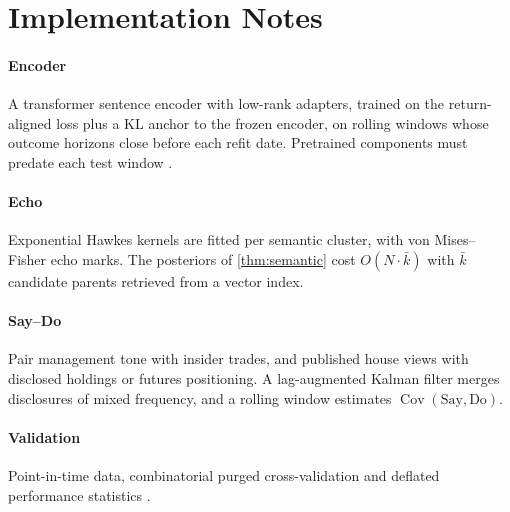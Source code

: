 \documentclass[10pt,twocolumn,letterpaper]{article}
\theoremstyle{plain}
\theoremstyle{definition}
\theoremstyle{remark}
\DeclareMathOperator{\Cov}{Cov}
\begin{document}
\section{Implementation Notes}\label{app:impl}

\paragraph{Encoder} A transformer sentence encoder \citep{reimers2019} with low-rank adapters, trained on the return-aligned loss plus a KL anchor to the frozen encoder, on rolling windows whose outcome horizons close before each refit date. Pretrained components must predate each test window \citep{glasserman2023}.

\paragraph{Echo} Exponential Hawkes kernels are fitted per semantic cluster, with von Mises--Fisher echo marks. The posteriors of \cref{thm:semantic} cost $O(N\cdot\bar k)$ with $\bar k$ candidate parents retrieved from a vector index.

\paragraph{Say--Do} Pair management tone with insider trades, and published house views with disclosed holdings or futures positioning. A lag-augmented Kalman filter merges disclosures of mixed frequency, and a rolling window estimates $\Cov(\text{Say},\text{Do})$.

\paragraph{Validation} Point-in-time data, combinatorial purged cross-validation and deflated performance statistics \citep{lopezdeprado2018,bailey2014dsr}.
\end{document}
